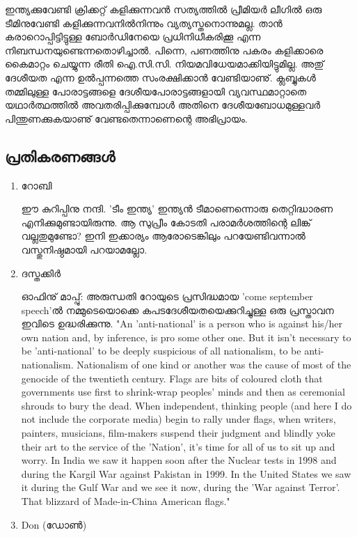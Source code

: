 ഇന്ത്യക്കുവേണ്ടി ക്രിക്കറ്റ് കളിക്കുന്നവന്‍ സത്യത്തില്‍ പ്രീമിയര്‍ ലീഗില്‍ ഒരു ടീമിനുവേണ്ടി കളിക്കുന്നവനില്‍നിന്നും 
വ്യത്യസ്തനൊന്നുമല്ല. താന്‍ കരാറൊപ്പിട്ടിട്ടുള്ള ബോര്‍ഡിനേയെ പ്രധിനിധീകരിക്കൂ എന്ന നിബന്ധനയുണ്ടെന്നതൊഴിച്ചാല്‍. 
പിന്നെ, പണത്തിനു പകരം കളിക്കാരെ കൈമാറ്റം ചെയ്യുന്ന രീതി ഐ.സി.സി. നിയമവിധേയമാക്കിയിട്ടുമില്ല. 
അതു് ദേശീയത എന്ന ഉല്‍പ്പന്നത്തെ സംരക്ഷിക്കാന്‍ വേണ്ടിയാണു്. ക്ലബ്ബുകള്‍ തമ്മിലുള്ള പോരാട്ടങ്ങളെ 
ദേശീയപോരാട്ടങ്ങളായി വ്യവസ്ഥമാറ്റാതെ യഥാര്‍ത്ഥത്തില്‍ അവതരിപ്പിക്കുമ്പോള്‍ അതിനെ ദേശീയബോധമുള്ളവര്‍ 
പിന്തുണക്കുകയാണു് വേണ്ടതെന്നാണെന്റെ അഭിപ്രായം.

\subsection*{പ്രതികരണങ്ങള്‍}
\begin{enumerate}
 \item{റോബി}

ഈ കുറിപ്പിനു നന്ദി. 'ടീം ഇന്ത്യ' ഇന്ത്യന്‍ ടീമാണെന്നൊരു തെറ്റിദ്ധാരണ എനിക്കുമുണ്ടായിരുന്നു. 
ആ സുപ്രീം കോടതി പരാമര്‍ശത്തിന്റെ ലിങ്ക് വല്ലതുമുണ്ടോ? ഇനി ഇക്കാര്യം ആരോടെങ്കിലും 
പറയേണ്ടിവന്നാല്‍ വസ്തുനിഷ്ഠമായി പറയാമല്ലോ.

 \item{ദസ്തക്കിര്‍}

ഓഫിനു് മാപ്പു്: അരുന്ധതി റോയുടെ പ്രസിദ്ധമായ 'come september speech'ല്‍ നമ്മുടെയൊക്കെ കപടദേശീയതയെക്കുറിച്ചുള്ള 
ഒരു പ്രസ്താവന ഇവിടെ ഉദ്ധരിക്കുന്നു. "An 'anti-national' is a person who is against his/her 
own nation and, by inference, is pro some other one. But it isn't necessary to be 'anti-national' 
to be deeply suspicious of all nationalism, to be anti-nationalism. Nationalism of one kind or 
another was the cause of most of the genocide of the twentieth century. 
Flags are bits of coloured cloth that governments use first to shrink-wrap peoples' 
minds and then as ceremonial shrouds to bury the dead. When independent, thinking people 
(and here I do not include the corporate media) begin to rally under flags, when writers, 
painters, musicians, film-makers suspend their judgment and blindly yoke their art to the service of the 'Nation', 
it's time for all of us to sit up and worry. In India we saw it happen soon after the Nuclear tests in 
1998 and during the Kargil War against Pakistan in 1999. In the United States we saw it during 
the Gulf War and we see it now, during the 'War against Terror'. 
That blizzard of Made-in-China American flags."

 \item{Don (ഡോണ്‍)}


\end{enumerate}
